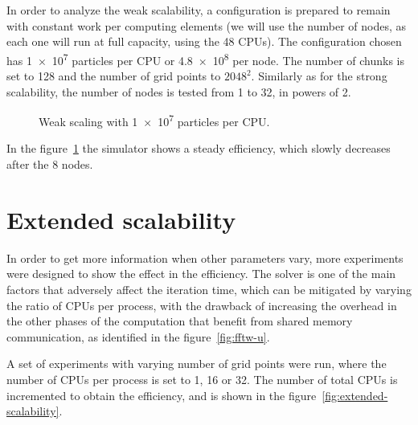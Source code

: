 In order to analyze the weak scalability, a configuration is prepared to remain 
with constant work per computing elements (we will use the number of nodes, as 
each one will run at full capacity, using the 48 CPUs). The configuration chosen 
has \num{1e7} particles per CPU or \num{4.8e8} per node. The number of chunks is 
set to 128 and the number of grid points to $2048^2$. Similarly as for the 
strong scalability, the number of nodes is tested from 1 to 32, in powers of 2.
%
\begin{figure}%
\centering
{}
\caption{Weak scaling with \num{1e7} particles per CPU.}
\label{fig:weak-scaling}
\end{figure}%
%
In the figure~\ref{fig:weak-scaling} the simulator shows a steady efficiency, 
which slowly decreases after the 8 nodes.


\section{Extended scalability}

In order to get more information when other parameters vary, more experiments 
were designed to show the effect in the efficiency. The solver is one of the 
main factors that adversely affect the iteration time, which can be mitigated by 
varying the ratio of CPUs per process, with the drawback of increasing the 
overhead in the other phases of the computation that benefit from shared memory 
communication, as identified in the figure~\ref{fig:fftw-u}.

A set of experiments with varying number of grid points were run, where the 
number of CPUs per process is set to 1, 16 or 32. The number of total CPUs is 
incremented to obtain the efficiency, and is shown in the 
figure~\ref{fig:extended-scalability}.


